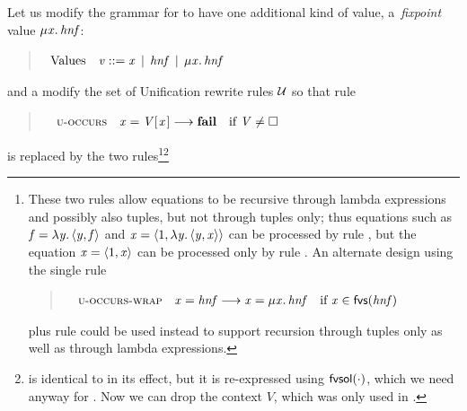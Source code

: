Let us modify the grammar for \versecalc{} to have one additional kind of value, a~\emph{fixpoint} value \ensuremath{\mu\Varid{x}.\,\mathit{hnf}}:
\begin{quote}
$
\begin{array}{lr@{\;}c@{\;}l}
      \text{Values} & \ensuremath{\Varid{v}} & ::= & \ensuremath{\Varid{x}}  \vb \hnf \vb \ensuremath{\mu\Varid{x}.\,\mathit{hnf}} \\
\end{array}
$
\end{quote}
and a modify the set of Unification rewrite rules $\mathcal{U}$ so that rule 
\begin{quote}
$
\begin{array}{@{\quad}lr@{\;}c@{\;} l l}
  \rulename{u-occurs} & \ensuremath{\Varid{x}\mathrel{=}\Conid{V} [\mskip1.5mu \Varid{x}\mskip1.5mu]} & \movesto & \ensuremath{\textbf{fail}} & \text{if $\ensuremath{\Conid{V}} \ne \ensuremath{\hole}$} \\
\end{array}
$
\end{quote}
is replaced by the two rules\footnote{These two rules allow equations to be recursive through lambda expressions and possibly also tuples, but not through tuples only;
  thus equations such as \ensuremath{\Varid{f}\mathrel{=}\lambda\Varid{y}.\,\langle{}\Varid{y},\Varid{f}\rangle} and \ensuremath{\Varid{x}\mathrel{=}\langle{}\mathrm{1},\lambda\Varid{y}.\,\langle{}\Varid{y},\Varid{x}\rangle\rangle} can be processed by rule ,
  but the equation \ensuremath{\Varid{x}\mathrel{=}\langle{}\mathrm{1},\Varid{x}\rangle} can be processed only by rule .
  An alternate design using the single rule
  \begin{quote}
$
\begin{array}{@{\quad}lr@{\;}c@{\;} l l}
  \rulename{u-occurs-wrap} & \ensuremath{\Varid{x}\mathrel{=}\mathit{hnf}} & \movesto & \ensuremath{\Varid{x}\mathrel{=}\mu\Varid{x}.\,\mathit{hnf}} & \text{if $\ensuremath{\Varid{x}} \in \freevars{\ensuremath{\mathit{hnf}}}$} \\
\end{array}
$
\end{quote}
plus rule  could be used instead to support recursion through tuples only as well as through lambda expressions.}\footnote{
   is identical to  in its effect,
  but it is re-expressed using $\mathsf{fvsol}(\cdot)$, which we need anyway for .  Now we can drop the context $V$, which was only
  used in .
}
